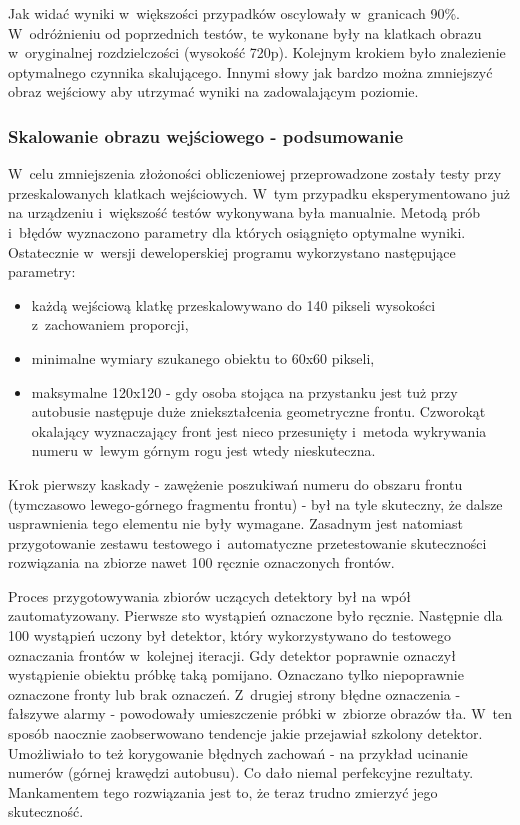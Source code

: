 Jak widać wyniki w~większości przypadków oscylowały w~granicach 90\%.
W~odróżnieniu od poprzednich testów, te wykonane były na klatkach obrazu
w~oryginalnej rozdzielczości (wysokość 720p). 
Kolejnym krokiem było znalezienie
optymalnego czynnika skalującego. Innymi słowy jak bardzo można zmniejszyć
obraz wejściowy aby utrzymać wyniki na zadowalającym poziomie.

\subsubsection{Skalowanie obrazu wejściowego - podsumowanie}

W~celu zmniejszenia złożoności obliczeniowej przeprowadzone zostały
testy przy przeskalowanych klatkach wejściowych. W~tym przypadku
eksperymentowano już na urządzeniu i~większość testów wykonywana była
manualnie. Metodą prób i~błędów wyznaczono parametry dla których
osiągnięto optymalne wyniki. Ostatecznie w~wersji deweloperskiej 
programu wykorzystano następujące parametry:

\begin{itemize}
    \item każdą wejściową klatkę przeskalowywano do 140 pikseli wysokości
        z~zachowaniem proporcji,
    \item minimalne wymiary szukanego obiektu to 60x60 pikseli,
    \item maksymalne 120x120 - gdy osoba stojąca na przystanku jest tuż
        przy autobusie następuje duże zniekształcenia geometryczne
        frontu. Czworokąt okalający wyznaczający front jest nieco
        przesunięty i~metoda wykrywania numeru w~lewym górnym rogu jest
        wtedy nieskuteczna.
\end{itemize}

Krok pierwszy kaskady - zawężenie poszukiwań numeru do obszaru frontu
(tymczasowo lewego-górnego fragmentu frontu) - był na tyle skuteczny,
że dalsze usprawnienia tego elementu nie były wymagane. Zasadnym jest
natomiast przygotowanie zestawu testowego i~automatyczne 
przetestowanie skuteczności rozwiązania na zbiorze nawet 100 ręcznie
oznaczonych frontów.

Proces przygotowywania zbiorów uczących detektory był
na wpół zautomatyzowany. Pierwsze sto wystąpień oznaczone było ręcznie.
Następnie dla 100 wystąpień uczony był detektor, który wykorzystywano
do testowego oznaczania frontów w~kolejnej iteracji. Gdy detektor 
poprawnie oznaczył wystąpienie obiektu próbkę taką pomijano. Oznaczano
tylko niepoprawnie oznaczone fronty lub brak oznaczeń. Z~drugiej
strony błędne oznaczenia - fałszywe alarmy - powodowały umieszczenie
próbki w~zbiorze obrazów tła. W~ten sposób naocznie zaobserwowano 
tendencje jakie przejawiał szkolony detektor. Umożliwiało to też
korygowanie błędnych zachowań - na przykład ucinanie numerów (górnej
krawędzi autobusu). Co dało niemal perfekcyjne rezultaty. Mankamentem
tego rozwiązania jest to, że teraz trudno zmierzyć jego skuteczność.


